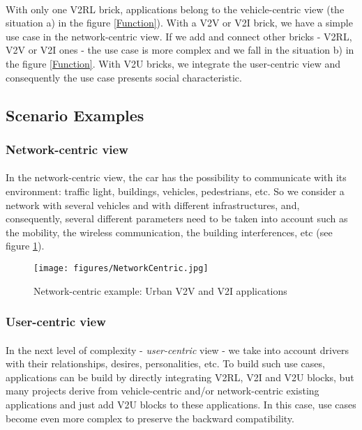 \documentclass[a4paper]{article}
\begin{document}
\paragraph{}With only one V2RL brick, applications belong to the vehicle-centric view (the situation a) in the figure \ref{Function}). With a V2V or V2I brick, we have a simple use case in the network-centric view. If we add and connect other bricks - V2RL, V2V or V2I ones - the use case is more complex and we fall in the situation b) in the figure \ref{Function}. With V2U bricks, we integrate the user-centric view and consequently the use case presents social characteristic. 


\subsection{Scenario Examples}

\subsubsection{Network-centric view}

\paragraph{}In the network-centric view, the car has the possibility to communicate with its environment: traffic light, buildings, vehicles, pedestrians, etc. So we consider a network with several vehicles and with different infrastructures, and, consequently, several different parameters need to be taken into account such as the mobility, the wireless communication, the building interferences, etc (see figure \ref{NetworkCentric}). 
\begin{figure}[!htb]
\begin{center}
\texttt{[image: figures/NetworkCentric.jpg]}
\caption{Network-centric example: Urban V2V and V2I applications}
\label{NetworkCentric}
\end{center}
\end{figure}
\subsubsection{User-centric view}

\paragraph{}In the next level of complexity - \textit{user-centric} view - we take into account drivers with their relationships, desires, personalities, etc. To build such use cases, applications can be build by directly integrating V2RL, V2I and V2U blocks, but many projects derive from vehicle-centric and/or network-centric existing applications and just add V2U blocks to these applications. In this case, use cases become even more complex to preserve the backward compatibility.
\end{document}
